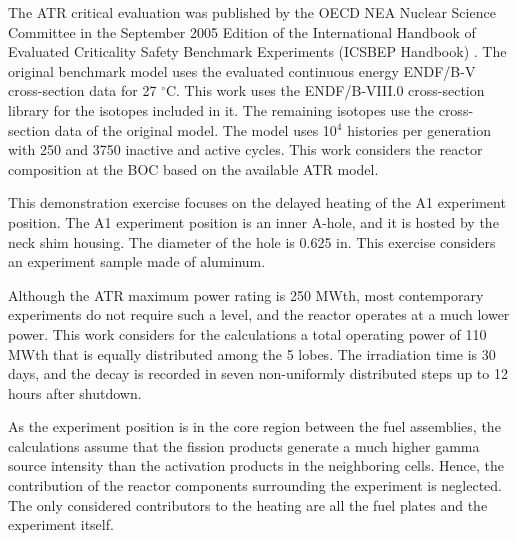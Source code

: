 The ATR critical evaluation was published by the OECD NEA Nuclear Science Committee in the September 2005 Edition of the International Handbook of Evaluated Criticality Safety Benchmark Experiments (ICSBEP Handbook) \cite{ICSBEP}.
The original benchmark model uses the evaluated continuous energy ENDF/B-V cross-section data for 27 $^{\circ}$C.
This work uses the ENDF/B-VIII.0 cross-section library for the isotopes included in it.
The remaining isotopes use the cross-section data of the original model.
The model uses 10$^4$ histories per generation with 250 and 3750 inactive and active cycles.
This work considers the reactor composition at the \gls*{BOC} based on the available ATR model.

This demonstration exercise focuses on the delayed heating of the A1 experiment position.
The A1 experiment position is an inner A-hole, and it is hosted by the neck shim housing.
The diameter of the hole is 0.625 in.
This exercise considers an experiment sample made of aluminum.

Although the ATR maximum power rating is 250 MWth, most contemporary experiments do not require such a level, and the reactor operates at a much lower power.
This work considers for the calculations a total operating power of 110 MWth that is equally distributed among the 5 lobes.
The irradiation time is 30 days, and the decay is recorded in seven non-uniformly distributed steps up to 12 hours after shutdown.

As the experiment position is in the core region between the fuel assemblies, the calculations assume that the fission products generate a much higher gamma source intensity than the activation products in the neighboring cells.
Hence, the contribution of the reactor components surrounding the experiment is neglected.
The only considered contributors to the heating are all the fuel plates and the experiment itself.


